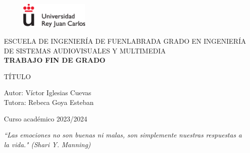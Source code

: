 \documentclass[12pt,a4paper,Spanish]{article}
\begin{document}
\renewcommand{\listtablename}{Índice de tablas} 


\begin{titlepage}
\begin{center}
\begin{figure}
	\centering
\includegraphics[width=0.3\textwidth]{./figs/logoURJC}
\end{figure}
\begin{center}
\large
ESCUELA DE INGENIERÍA DE FUENLABRADA
\vspace*{0.15in}
GRADO EN INGENIERÍA DE SISTEMAS AUDIOVISUALES Y MULTIMEDIA \\
\vspace*{0.6in}
{\large \bf TRABAJO FIN DE GRADO}\\
\end{center}
\vspace*{0.2in}
{\large
{TÍTULO} \\
}
\vspace*{0.3in}
\vspace*{0.3in}
\vspace*{0.1in}
\end{center}
{\large
Autor: Víctor Iglesias Cuevas  \\[0.2cm]
Tutora: Rebeca Goya Esteban \\[0.15cm]
}
\vspace*{0.1in}
\vspace*{0.1in}
\begin{center}Curso académico 2023/2024\end{center}
\end{titlepage}


\newpage
\thispagestyle{empty} %
\begin{flushright}
	\vspace*{5cm}
 	\textit{“Las emociones no son buenas ni malas, son simplemente nuestras respuestas a la vida." (Shari Y. Manning)}
\end{flushright}





\newpage
\thispagestyle{plain}
\end{document}
